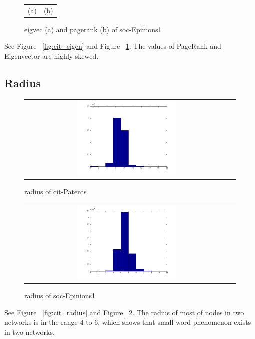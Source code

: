 \begin{figure}[htbf]
\begin{center}
\begin{tabular}{cc}
    (a) & (b) 
\end{tabular}
\caption{ eigvec (a) and pagerank (b) of soc-Epinions1}
\label{fig:soc_eigen}
\end{center}
\end{figure}

See Figure ~\ref{fig:cit_eigen}  and Figure ~\ref{fig:soc_eigen}. The values of PageRank and Eigenvector are highly skewed.

\subsection{Radius}

\begin{figure}[htbf]
\begin{center}
\begin{tabular}{cc}
     \includegraphics[width=0.5\textwidth]{FIG/cit_result/radius.png} \\
\end{tabular}
\caption{radius of cit-Patents}
\label{fig:cit_radius}
\begin{tabular}{cc}
     \includegraphics[width=0.5\textwidth]{FIG/soc_result/radius.png} \\
\end{tabular}
\caption{radius of soc-Epinions1}
\label{fig:soc_radius}
\end{center}
\end{figure}

See Figure ~\ref{fig:cit_radius} and Figure ~\ref{fig:soc_radius}. The radius of most of nodes in two networks is in the range 4 to 6, which shows that small-word phenomenon exists in two networks. 
